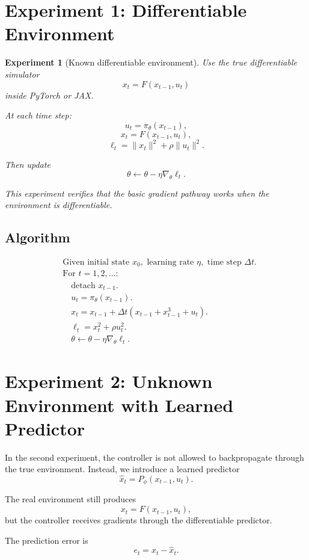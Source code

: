 \documentclass[11pt]{ctexart}
\newtheorem{experiment}{Experiment}
\begin{document}
\section{Experiment 1: Differentiable Environment}

\begin{experiment}[Known differentiable environment]
Use the true differentiable simulator
\[
x_t = F(x_{t-1},u_t)
\]
inside PyTorch or JAX.

At each time step:
\[
u_t=\pi_\theta(x_{t-1}),
\]
\[
x_t=F(x_{t-1},u_t),
\]
\[
\ell_t=\|x_t\|^2+\rho\|u_t\|^2.
\]

Then update
\[
\theta \leftarrow \theta-\eta\nabla_\theta \ell_t.
\]

This experiment verifies that the basic gradient pathway works when the environment is differentiable.
\end{experiment}

\subsection*{Algorithm}

\[
\begin{aligned}
&\text{Given initial state }x_0, \text{ learning rate }\eta, \text{ time step }\Delta t.\\
&\text{For }t=1,2,\dots:\\
&\quad \text{detach }x_{t-1}.\\
&\quad u_t=\pi_\theta(x_{t-1}).\\
&\quad x_t=x_{t-1}+\Delta t\left(x_{t-1}+x_{t-1}^3+u_t\right).\\
&\quad \ell_t=x_t^2+\rho u_t^2.\\
&\quad \theta\leftarrow \theta-\eta\nabla_\theta \ell_t.
\end{aligned}
\]

\section{Experiment 2: Unknown Environment with Learned Predictor}

In the second experiment, the controller is not allowed to backpropagate through the true environment. Instead, we introduce a learned predictor
\[
\hat x_t=P_\phi(x_{t-1},u_t).
\]

The real environment still produces
\[
x_t=F(x_{t-1},u_t),
\]
but the controller receives gradients through the differentiable predictor.

The prediction error is
\[
e_t=x_t-\hat x_t.
\]
\end{document}
